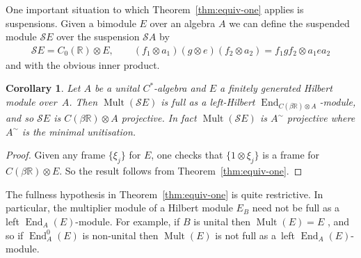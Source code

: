 \documentclass[10pt,a4paper]{amsart}
\numberwithin{equation}{section}
\newtheorem{corl}[thm]{Corollary}
 { \theoremstyle{definition}
\newtheorem{defn}[thm]{Definition}
\newtheorem{Example}[thm]{Example}
\newtheorem{rmk}[thm]{Remark}}
\DeclareMathOperator{\End}{End} %
\DeclareMathOperator{\Mult}{Mult} %
\renewcommand{\S}{\mathcal{S}}
\newcommand{\ox}{\otimes} %
\newcommand{\R}{\mathbb{R}} %
\begin{document}
One important situation to which Theorem~\ref{thm:equiv-one} applies is suspensions. Given a bimodule $E$ over an algebra $A$ we can def\/ine the suspended module $\S E$ over the suspension $\S A$ by
\begin{gather*}
\S E=C_0(\R)\ox E,\qquad (f_1\ox a_1)(g\ox e)(f_2\ox a_2) =f_1gf_2\ox a_1ea_2
\end{gather*}
and with the obvious inner product.

\begin{corl}\label{lem:suspensions} Let $A$ be a unital $C^*$-algebra and $E$ a finitely generated Hilbert module over~$A$. Then $\Mult(\S E)$ is full as a left-Hilbert $\End_{C(\beta\R)\ox A}$-module, and so $\S E$ is $C(\beta\R)\ox A$ projective. In fact $\Mult(\S E)$ is $A^\sim$ projective where $A^\sim$ is the minimal unitisation.
\end{corl}

\begin{proof}
Given any frame $\{\xi_j\}$ for $E$, one checks that $\{1\ox\xi_j\}$ is a frame for $C(\beta\R)\ox E$. So the result follows from Theorem~\ref{thm:equiv-one}.
\end{proof}

The fullness hypothesis in Theorem~\ref{thm:equiv-one} is quite restrictive. In particular, the multiplier module of a Hilbert module ${E_B}$ need not be full as a left $\End_A(E)$-module. For example, if $B$ is unital then $\Mult(E) = E$ \cite{ER}, and so if $\End_A^0(E)$ is non-unital then $\Mult(E)$ is not full as a~left $\End_A(E)$-module.
\end{document}
